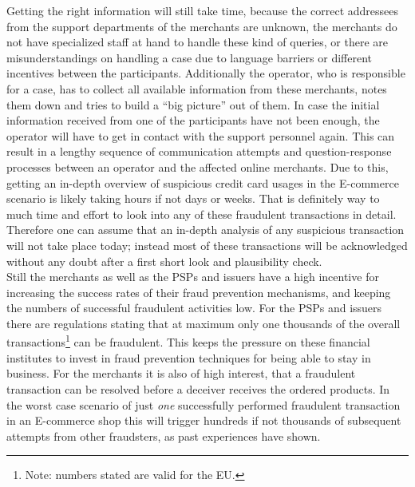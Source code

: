 Getting the right information will still take time, because the correct addressees from the support departments of the merchants are unknown, the merchants do not have specialized staff at hand to handle these kind of queries, or there are misunderstandings on handling a case due to language barriers or different incentives between the participants. Additionally the operator, who is responsible for a case, has to collect all available information from these merchants, notes them down and tries to build a ``big picture'' out of them. In case the initial information received from one of the participants have not been enough, the operator will have to get in contact with the support personnel again. This can result in a lengthy sequence of communication attempts and question-response processes between an operator and the affected online merchants. Due to this, getting an in-depth overview of suspicious credit card usages in the \gls{E-commerce} scenario is likely taking hours if not days or weeks. That is definitely way to much time and effort to look into any of these fraudulent transactions in detail. Therefore one can assume that an in-depth analysis of any suspicious transaction will not take place today; instead most of these transactions will be acknowledged without any doubt after a first short look and plausibility check. \\

Still the merchants as well as the \gls{PSP}s and issuers have a high incentive for increasing the success rates of their fraud prevention mechanisms, and keeping the numbers of successful fraudulent activities low. For the \gls{PSP}s and issuers there are regulations stating that at maximum only one thousands of the overall transactions\footnote{Note: numbers stated are valid for the EU.} can be fraudulent. This keeps the pressure on these financial institutes to invest in fraud prevention techniques for being able to stay in business. For the merchants it is also of high interest, that a fraudulent transaction can be resolved before a deceiver receives the ordered products. In the worst case scenario of just \emph{one} successfully performed fraudulent transaction in an \gls{E-commerce} shop this will trigger hundreds if not thousands of subsequent attempts from other fraudsters, as past experiences have shown.


